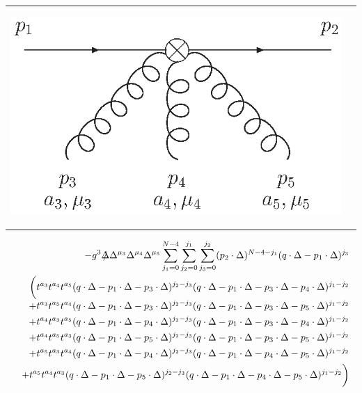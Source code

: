\documentclass[12pt]{article}
\def\Slash#1{\rlap{\hbox{$\mskip 3 mu /$}}#1}      %
\begin{document}
\begin{tabular}[h]{ll}
%
\hspace*{-10mm}
\begin{minipage}{3cm}
\vspace*{-5mm}
\begin{flushleft}
  \includegraphics[width=2.25\textwidth, angle=0]{OMEqqggg}
\end{flushleft}
\end{minipage}
&
\begin{minipage}{13.0cm}
\end{minipage}
%  
\end{tabular}
%
  \begin{eqnarray}
    \label{eq:omeqqggg}
    &&
    - g^3
    \Slash{\Delta} \Delta^{\mu_3} \Delta^{\mu_4} \Delta^{\mu_5} 
    \sum\limits_{j_1=0}^{N-4}
    \sum\limits_{j_2=0}^{j_1}
    \sum\limits_{j_3=0}^{j_2}
    (p_2\cdot \Delta)^{N-4-j_1} (q\cdot \Delta-p_1\cdot \Delta)^{j_3} 
    \nonumber
    \\
    &&
    \biggl( 
    t^{a_3} t^{a_4} t^{a_5} (q\cdot \Delta-p_1\cdot \Delta-p_3\cdot \Delta)^{j_2-j_3} (q\cdot \Delta-p_1\cdot \Delta-p_3\cdot \Delta-p_4\cdot \Delta)^{j_1-j_2}
    \nonumber
    \\[-1mm]
    &&
    + t^{a_3} t^{a_5} t^{a_4} (q\cdot \Delta-p_1\cdot \Delta-p_3\cdot \Delta)^{j_2-j_3} (q\cdot \Delta-p_1\cdot \Delta-p_3\cdot \Delta-p_5\cdot \Delta)^{j_1-j_2}
    \nonumber
    \\
    &&
    + t^{a_4} t^{a_3} t^{a_5} (q\cdot \Delta-p_1\cdot \Delta-p_4\cdot \Delta)^{j_2-j_3} (q\cdot \Delta-p_1\cdot \Delta-p_3\cdot \Delta-p_4\cdot \Delta)^{j_1-j_2}
    \nonumber
    \\
    &&
    + t^{a_4} t^{a_5} t^{a_3} (q\cdot \Delta-p_1\cdot \Delta-p_5\cdot \Delta)^{j_2-j_3} (q\cdot \Delta-p_1\cdot \Delta-p_3\cdot \Delta-p_5\cdot \Delta)^{j_1-j_2}
    \nonumber
    \\
    &&
    + t^{a_5} t^{a_3} t^{a_4} (q\cdot \Delta-p_1\cdot \Delta-p_4\cdot \Delta)^{j_2-j_3} (q\cdot \Delta-p_1\cdot \Delta-p_4\cdot \Delta-p_5\cdot \Delta)^{j_1-j_2}
    \nonumber
    \\
    &&
    + t^{a_5} t^{a_4} t^{a_3} (q\cdot \Delta-p_1\cdot \Delta-p_5\cdot \Delta)^{j_2-j_3} (q\cdot \Delta-p_1\cdot \Delta-p_4\cdot \Delta-p_5\cdot \Delta)^{j_1-j_2}
    \biggr)
  \end{eqnarray}
%
\end{document}
